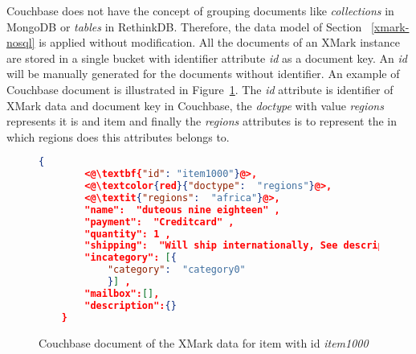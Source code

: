 Couchbase does not have the concept of grouping documents like \textit{collections} in MongoDB  or \textit{tables} in RethinkDB. 
Therefore, the data model of Section ~\ref{xmark-nosql} is applied without modification.
 All the documents of an XMark instance  are stored in a single bucket with identifier attribute \textit{id} as a document key. An \textit{id} will be manually generated for the documents without identifier.
An example of Couchbase document is illustrated in Figure~\ref{code:couchbase-item0}. The \textit{id} attribute is identifier of XMark data and document key in Couchbase, the \textit{doctype} with  value \textit{regions} represents it is and item and finally the \textit{regions} attributes is to represent the in which regions does this attributes belongs to.
\begin{figure}[hbt]
\begin{lstlisting}[language=JSON,  basicstyle =\scriptsize]
    {
    	<@\textbf{"id": "item1000"}@>,
    	<@\textcolor{red}{"doctype":  "regions"}@>,
    	<@\textit{"regions":  "africa"}@>,
    	"name":  "duteous nine eighteen" ,
    	"payment":  "Creditcard" ,
    	"quantity": 1 ,
    	"shipping":  "Will ship internationally, See description for charges" ,
    	"incategory": [{
    		"category":  "category0"
    		}] ,
    	"mailbox":[],
    	"description":{}
    }
\end{lstlisting} 
\caption{Couchbase document of the XMark data for item with id \textit{item1000}}
\label{code:couchbase-item0}
\end{figure}
